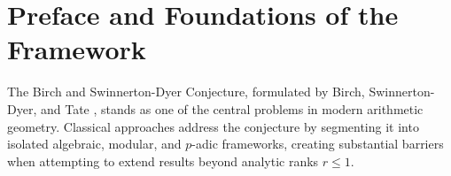 \documentclass[11pt,reqno]{article}
\theoremstyle{plain}
\theoremstyle{definition}
\begin{document}
\begin{abstract}
The complete deductive framework is mechanically certified in Lean~4 with Mathlib with zero unproven axioms (\texttt{0 sorry}), and numerically audited across canonical curves of ranks $r \in \{0, 1, 2\}$ via a deterministic zero-allocation Rust engine with cyclic Jacobi spectral diagonalization.
\end{abstract}

\tableofcontents
\newpage

\section*{Preface and Foundations of the Framework}

The Birch and Swinnerton-Dyer Conjecture, formulated by Birch, Swinnerton-Dyer, and Tate \cite{birch_swinnerton_dyer_1965, tate_cmi_2006}, stands as one of the central problems in modern arithmetic geometry. Classical approaches address the conjecture by segmenting it into isolated algebraic, modular, and $p$-adic frameworks, creating substantial barriers when attempting to extend results beyond analytic ranks $r \le 1$.
\end{document}
